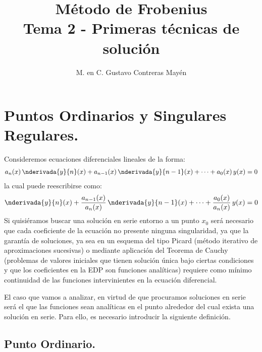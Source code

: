 
\title{Método de Frobenius \\[0.3em]  \large{Tema 2 - Primeras técnicas de solución} \vspace{-3ex}}
\author{M. en C. Gustavo Contreras Mayén}
\date{ }

\pagestyle{fancy}
\fancyhf{}
\lhead{\leftmark}
\rfoot{\thepage}
\setlength{\headheight}{16pt}%


\vspace{-4cm}
\maketitle
\fontsize{14}{14}\selectfont
\tableofcontents
\newpage

\section{Puntos Ordinarios y Singulares Regulares.}

Consideremos ecuaciones diferenciales lineales de la forma:
\begin{align}
a_{n} (x) \, \nderivada{y}{n} (x) + a_{n-1} (x) \, \nderivada{y}{n-1} (x)+ \cdots + a_{0} (x) \, y(x) = 0
\label{eq:ecuacion_01}
\end{align}
la cual puede reescribirse como:
\begin{align}
\nderivada{y}{n} (x) + \dfrac{a_{n-1} (x)}{a_{n} (x)} \, \nderivada{y}{n-1} (x)+ \cdots + \dfrac{a_{0} (x)}{a_{n} (x)} \, y(x) = 0
\label{eq:ecuacion_02}
\end{align}
Si quisiéramos buscar una solución en serie entorno a un punto $x_{0}$ será necesario que cada coeficiente de la ecuación no presente ninguna singularidad, ya que la garantía de soluciones, ya sea en un esquema del tipo Picard (método iterativo de aproximaciones sucesivas) o mediante aplicación del Teorema de Cauchy (problemas de valores iniciales que tienen solución única bajo ciertas condiciones y que los coeficientes en la EDP son funciones analíticas) requiere como mínimo continuidad de las funciones intervinientes en la ecuación diferencial.
\par
El caso que vamos a analizar, en virtud de que procuramos soluciones en serie será el que las funciones sean analíticas en el punto alrededor del cual exista una solución en serie. Para ello, es necesario introducir la siguiente definición.

\subsection{Punto Ordinario.}

